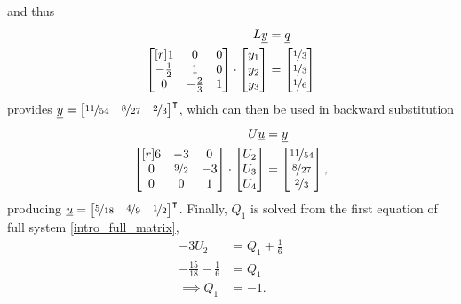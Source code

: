 and thus
\begin{align*}
  L\underline{y} &= \underline{q} \\
  \begin{bmatrix}[r]
     1           &  0           &  0 \\
    -\frac{1}{2} &  1           &  0 \\
     0           & -\frac{2}{3} &  1 \\
  \end{bmatrix} \cdot
  \begin{bmatrix} y_1 \\ y_2 \\ y_3 \end{bmatrix} &=
  \begin{bmatrix} \nicefrac{1}{3} \\ \nicefrac{1}{3} \\ \nicefrac{1}{6} \end{bmatrix}
\end{align*}
provides $\underline{y} = \begin{bmatrix} \nicefrac{11}{54} & \nicefrac{8}{27} & \nicefrac{2}{3} \end{bmatrix}^\intercal$, which can then be used in backward substitution
\begin{align*}
  U\underline{u} &= \underline{y} \\
  \begin{bmatrix}[r]
     6 & -3               &  0 \\
     0 &  \nicefrac{9}{2} & -3 \\
     0 &  0               &  1 \\
  \end{bmatrix} \cdot
  \begin{bmatrix} U_2 \\ U_3 \\ U_4 \end{bmatrix} &=
  \begin{bmatrix} \nicefrac{11}{54} \\ \nicefrac{8}{27} \\ \nicefrac{2}{3} \end{bmatrix},
\end{align*}
producing $\underline{u} = \begin{bmatrix} \nicefrac{5}{18} & \nicefrac{4}{9} & \nicefrac{1}{2} \end{bmatrix}^\intercal$.  Finally, $Q_1$ is solved from the first equation of full system \cref{intro_full_matrix},
\begin{align*}
  -3U_2 &= Q_1 + \frac{1}{6} \\
  -\frac{15}{18} - \frac{1}{6} &= Q_1 \\
  \implies Q_1 &= - 1.
\end{align*}

